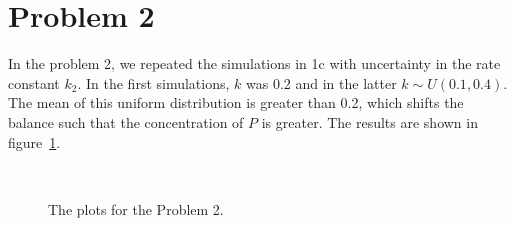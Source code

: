 \documentclass[a4paper]{article}
\begin{document}
\section*{Problem 2}
In the problem 2, we repeated the simulations in 1c with uncertainty in the
rate constant $k_2$. In the first simulations, $k$ was 0.2 and in the latter
$k\sim U(0.1,0.4)$. The mean of this uniform distribution is greater than 0.2,
which shifts the balance such that the concentration of $P$ is greater. The
results are shown in figure~\ref{fig:sim-2}.
\begin{figure}[htp]
  \centering

  \\
  \caption{The plots for the Problem 2.}\label{fig:sim-2}
  
\end{figure}
\end{document}
